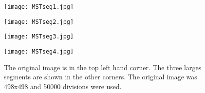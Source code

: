 \vfill
\begin{figure}[ht]
\begin{minipage}[b]{0.47\linewidth}
\centering
\texttt{[image: MSTseg1.jpg]}
\end{minipage}
\hspace{0.5cm}
\begin{minipage}[b]{0.47\linewidth}
\centering
\texttt{[image: MSTseg2.jpg]}
\end{minipage}
\begin{minipage}[b]{0.47\linewidth}
\centering
\texttt{[image: MSTseg3.jpg]}
\end{minipage}
\hspace{0.5cm}
\begin{minipage}[b]{0.47\linewidth}
\centering
\texttt{[image: MSTseg4.jpg]}
\end{minipage}
\caption{The original image is in the top left hand corner. The three larges segments are shown in the other corners. The original image was 498x498 and 50000 divisions were used.}
\label{mst:graph6}
\end{figure}
\vfill 
